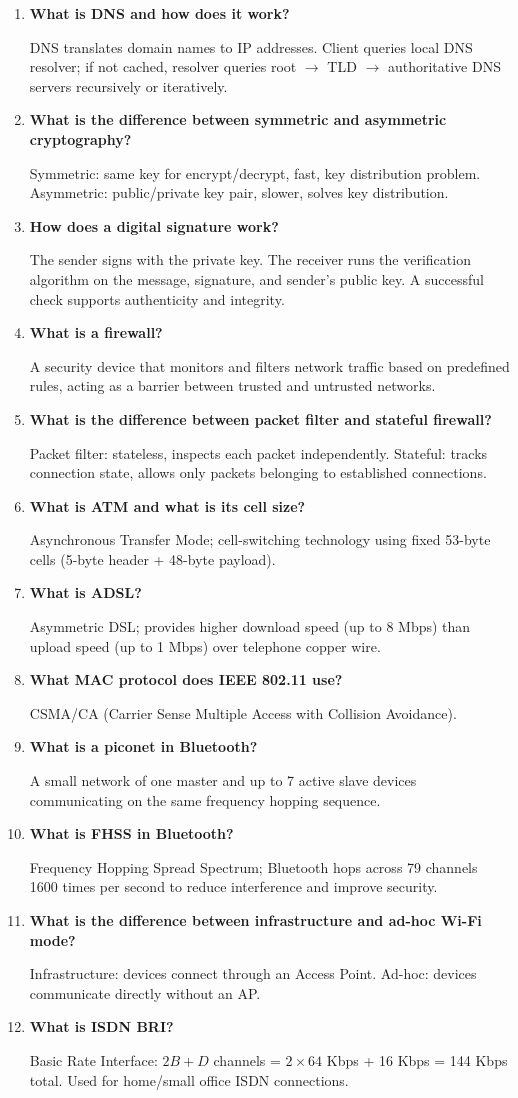 \documentclass[12pt,a4paper]{article}
\newcommand{\Q}[1]{\textbf{#1}\par\noindent\ignorespaces}
\begin{document}
\begin{tcolorbox}[exambox, title={\textbf{Frequently Asked / Viva Questions}}]
\begin{enumerate}[leftmargin=*, topsep=0pt, label=\textbf{Q\arabic*.}, itemsep=8pt]
  \item \Q{What is DNS and how does it work?} DNS translates domain names to IP addresses. Client queries local DNS resolver; if not cached, resolver queries root $\to$ TLD $\to$ authoritative DNS servers recursively or iteratively.
  \item \Q{What is the difference between symmetric and asymmetric cryptography?} Symmetric: same key for encrypt/decrypt, fast, key distribution problem. Asymmetric: public/private key pair, slower, solves key distribution.
  \item \Q{How does a digital signature work?} The sender signs with the private key. The receiver runs the verification algorithm on the message, signature, and sender's public key. A successful check supports authenticity and integrity.
  \item \Q{What is a firewall?} A security device that monitors and filters network traffic based on predefined rules, acting as a barrier between trusted and untrusted networks.
  \item \Q{What is the difference between packet filter and stateful firewall?} Packet filter: stateless, inspects each packet independently. Stateful: tracks connection state, allows only packets belonging to established connections.
  \item \Q{What is ATM and what is its cell size?} Asynchronous Transfer Mode; cell-switching technology using fixed 53-byte cells (5-byte header + 48-byte payload).
  \item \Q{What is ADSL?} Asymmetric DSL; provides higher download speed (up to 8 Mbps) than upload speed (up to 1 Mbps) over telephone copper wire.
  \item \Q{What MAC protocol does IEEE 802.11 use?} CSMA/CA (Carrier Sense Multiple Access with Collision Avoidance).
  \item \Q{What is a piconet in Bluetooth?} A small network of one master and up to 7 active slave devices communicating on the same frequency hopping sequence.
  \item \Q{What is FHSS in Bluetooth?} Frequency Hopping Spread Spectrum; Bluetooth hops across 79 channels 1600 times per second to reduce interference and improve security.
  \item \Q{What is the difference between infrastructure and ad-hoc Wi-Fi mode?} Infrastructure: devices connect through an Access Point. Ad-hoc: devices communicate directly without an AP.
  \item \Q{What is ISDN BRI?} Basic Rate Interface: $2B + D$ channels = $2 \times 64$ Kbps + 16 Kbps = 144 Kbps total. Used for home/small office ISDN connections.
\end{enumerate}
\end{tcolorbox}
\end{document}
